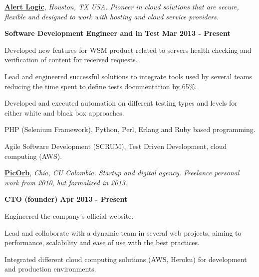 
\href{http://alertlogic.com/}{\textbf{Alert Logic}}, \textit{Houston, TX USA.
Pioneer in cloud solutions that are secure, flexible and designed to work with
hosting and cloud service providers.}
\begin{outerlist}
\item[] \textbf{Software Development Engineer and in Test} \hfill \textbf{Mar
2013 - Present}
    \begin{innerlist}
\item Developed new features for WSM product related to servers
health checking and verification of content for received requests.
\item Lead and engineered successful solutions to integrate tools
used by several teams reducing the time spent to define tests documentation by 65\%.
\item Developed and executed automation on different testing types and levels
for either white and black box approaches.
\item PHP (Selenium Framework), Python, Perl, Erlang and Ruby based programming.
\item Agile Software Development (SCRUM), Test Driven Development, cloud
computing (AWS).
    \end{innerlist}
\end{outerlist}

\quarterblankline

\href{http://www.picorb.com/}{\textbf{PicOrb}}, \textit{Ch\'ia, CU Colombia.
Startup and digital agency. Freelance personal work from 2010, but formalized in
2013.}
\begin{outerlist}
\item[] \textbf{CTO (founder)} \hfill \textbf{Apr 2013 -
Present}
    \begin{innerlist}
\item Engineered the company's official website.
\item Lead and collaborate with a dynamic team in several
web projects, aiming to performance, scalability and ease of use with
the best practices.
\item Integrated different cloud computing solutions (AWS, Heroku) for
development and production environments.
    \end{innerlist}
\end{outerlist}

\quarterblankline

